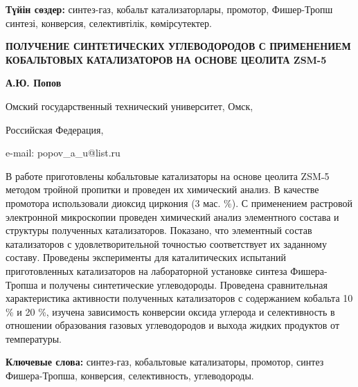 {\bfseries Түйін сөздер:} синтез-газ, кобальт катализаторлары, промотор,
Фишер-Тропш синтезі, конверсия, селективтілік, көмірсутектер.

\begin{center}
{\large\bfseries ПОЛУЧЕНИЕ СИНТЕТИЧЕСКИХ УГЛЕВОДОРОДОВ С ПРИМЕНЕНИЕМ КОБАЛЬТОВЫХ
КАТАЛИЗАТОРОВ НА ОСНОВЕ ЦЕОЛИТА ZSM-5}

{\bfseries А.Ю. Попов}

Омский государственный технический университет, Омск,

Российская Федерация,

e-mail: popov\_a\_u@list.ru
\end{center}

В работе приготовлены кобальтовые катализаторы на основе цеолита ZSM˗5
методом тройной пропитки и проведен их химический анализ. В качестве
промотора использовали диоксид циркония (3 мас. \%). С применением
растровой электронной микроскопии проведен химический анализ элементного
состава и структуры полученных катализаторов. Показано, что элементный
состав катализаторов с удовлетворительной точностью соответствует их
заданному составу. Проведены эксперименты для каталитических испытаний
приготовленных катализаторов на лабораторной установке синтеза
Фишера-Тропша и получены синтетические углеводороды. Проведена
сравнительная характеристика активности полученных катализаторов с
содержанием кобальта 10 \% и 20 \%, изучена зависимость конверсии оксида
углерода и селективность в отношении образования газовых углеводородов и
выхода жидких продуктов от температуры.

{\bfseries Ключевые слова:} синтез-газ, кобальтовые катализаторы, промотор,
синтез Фишера-Тропша, конверсия, селективность, углеводороды.

